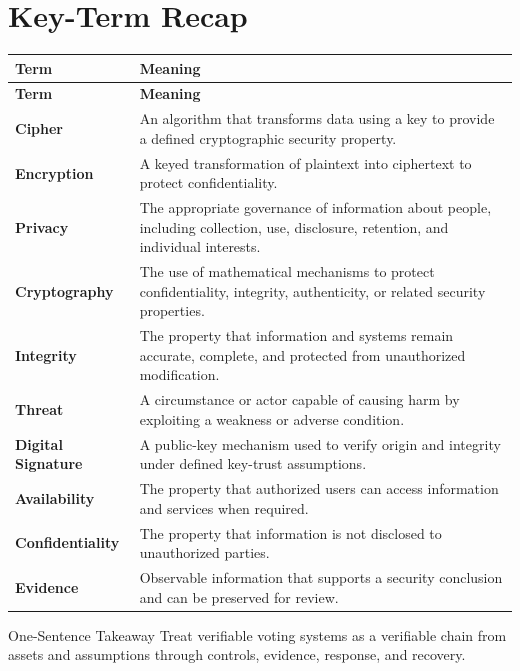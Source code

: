 \documentclass[11pt,letterpaper]{article}
\begin{document}
\section*{Key-Term Recap}
\begin{longtable}{>{\raggedright\arraybackslash}p{}>{\raggedright\arraybackslash}p{}}
\toprule\rowcolor{Navy}\color{white}\textbf{Term} & \color{white}\textbf{Meaning}\\\midrule
\endfirsthead
\toprule\rowcolor{Navy}\color{white}\textbf{Term} & \color{white}\textbf{Meaning}\\\midrule
\endhead
\textbf{Cipher} & An algorithm that transforms data using a key to provide a defined cryptographic security property. \\\midrule
\textbf{Encryption} & A keyed transformation of plaintext into ciphertext to protect confidentiality. \\\midrule
\textbf{Privacy} & The appropriate governance of information about people, including collection, use, disclosure, retention, and individual interests. \\\midrule
\textbf{Cryptography} & The use of mathematical mechanisms to protect confidentiality, integrity, authenticity, or related security properties. \\\midrule
\textbf{Integrity} & The property that information and systems remain accurate, complete, and protected from unauthorized modification. \\\midrule
\textbf{Threat} & A circumstance or actor capable of causing harm by exploiting a weakness or adverse condition. \\\midrule
\textbf{Digital Signature} & A public-key mechanism used to verify origin and integrity under defined key-trust assumptions. \\\midrule
\textbf{Availability} & The property that authorized users can access information and services when required. \\\midrule
\textbf{Confidentiality} & The property that information is not disclosed to unauthorized parties. \\\midrule
\textbf{Evidence} & Observable information that supports a security conclusion and can be preserved for review. \\\midrule
\bottomrule
\end{longtable}
\begin{CornellExamBox}{One-Sentence Takeaway}
Treat verifiable voting systems as a verifiable chain from assets and assumptions through controls, evidence, response, and recovery.
\end{CornellExamBox}
\end{document}

